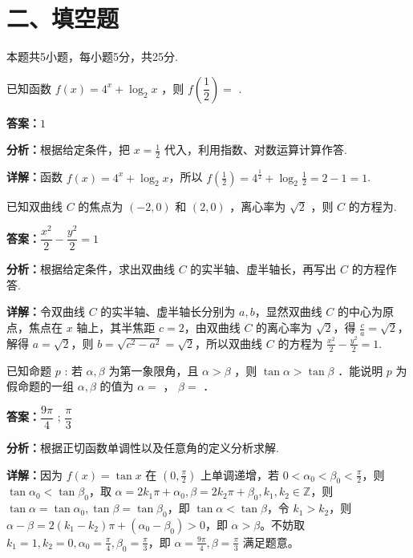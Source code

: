 \section*{二、填空题}
本题共5小题，每小题5分，共25分.

\begin{question}[points=5]
已知函数 $f(x) = 4^x + \log_2 x$ ，则 $f\left(\dfrac{1}{2}\right) =$ .
\fillin[{$1$}]
\begin{solution}
\textbf{答案：}$1$

\textbf{分析：}根据给定条件，把 $x=\frac12$ 代入，利用指数、对数运算计算作答.

\textbf{详解：}函数 $f(x)=4^x+\log_2 x$，所以 $f(\frac12)=4^{\frac12}+\log_2 \frac12 = 2 - 1 = 1$.
\end{solution}
\end{question}

\begin{question}[points=5]
已知双曲线 $C$ 的焦点为 $(-2,0)$ 和 $(2,0)$ ，离心率为 $\sqrt{2}$ ，则 $C$ 的方程为.
\fillin[{$\dfrac{x^2}{2} - \dfrac{y^2}{2} = 1$}]
\begin{solution}
\textbf{答案：}$\dfrac{x^2}{2} - \dfrac{y^2}{2} = 1$

\textbf{分析：}根据给定条件，求出双曲线 $C$ 的实半轴、虚半轴长，再写出 $C$ 的方程作答.

\textbf{详解：}令双曲线 $C$ 的实半轴、虚半轴长分别为 $a,b$，显然双曲线 $C$ 的中心为原点，焦点在 $x$ 轴上，其半焦距 $c=2$，由双曲线 $C$ 的离心率为 $\sqrt{2}$，得 $\frac{c}{a}=\sqrt{2}$，解得 $a=\sqrt{2}$，则 $b=\sqrt{c^2-a^2}=\sqrt{2}$，所以双曲线 $C$ 的方程为 $\frac{x^2}{2}-\frac{y^2}{2}=1$.
\end{solution}
\end{question}

\begin{question}[points=5]
已知命题 $p$ : 若 $\alpha, \beta$ 为第一象限角，且 $\alpha > \beta$ ，则 $\tan \alpha > \tan \beta$ ．能说明 $p$ 为假命题的一组 $\alpha, \beta$ 的值为 $\alpha =$ ， $\beta =$ ．
\begin{solution}
\textbf{答案：}$\dfrac{9\pi}{4}$ ; $\dfrac{\pi}{3}$

\textbf{分析：}根据正切函数单调性以及任意角的定义分析求解.

\textbf{详解：}因为 $f(x)=\tan x$ 在 $(0,\frac{\pi}{2})$ 上单调递增，若 $0<\alpha_0<\beta_0<\frac{\pi}{2}$，则 $\tan\alpha_0<\tan\beta_0$，取 $\alpha=2k_1\pi+\alpha_0, \beta=2k_2\pi+\beta_0, k_1,k_2\in\mathbb{Z}$，则 $\tan\alpha=\tan\alpha_0, \tan\beta=\tan\beta_0$，即 $\tan\alpha<\tan\beta$，令 $k_1>k_2$，则 $\alpha-\beta=2(k_1-k_2)\pi+(\alpha_0-\beta_0)>0$，即 $\alpha>\beta$。不妨取 $k_1=1,k_2=0,\alpha_0=\frac{\pi}{4},\beta_0=\frac{\pi}{3}$，即 $\alpha=\frac{9\pi}{4},\beta=\frac{\pi}{3}$ 满足题意。
\end{solution}
\end{question}

